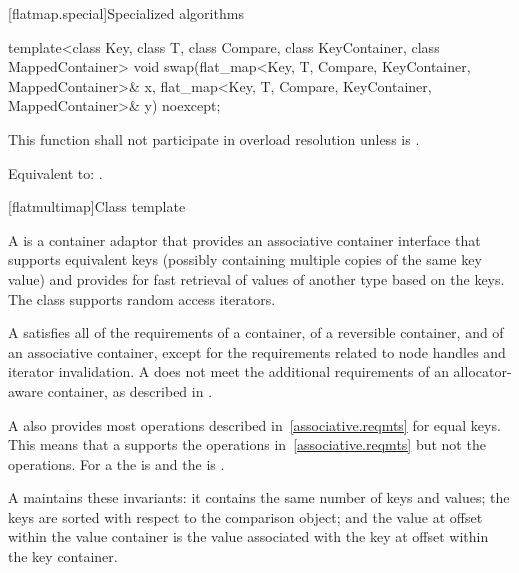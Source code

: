 \begin{codeblock}
\begin{codeblock}
\begin{codeblock}
\begin{addedblock}
[flatmap.special]{Specialized algorithms}

%
\begin{itemdecl}
template<class Key, class T, class Compare, class KeyContainer, class MappedContainer>
  void swap(flat_map<Key, T, Compare, KeyContainer, MappedContainer>& x,
            flat_map<Key, T, Compare, KeyContainer, MappedContainer>& y) noexcept;
\end{itemdecl}

\begin{itemdescr}
\pnum
\remarks
This function shall not participate in overload resolution
unless 
is .

\pnum
\effects Equivalent to: .
\end{itemdescr}

[flatmultimap]{Class template }

\pnum
{}%
\pnum
A  is a container adaptor that provides an associative
container interface that supports equivalent keys (possibly containing
multiple copies of the same key value) and provides for fast retrieval of
values of another type  based on the keys. The 
class supports random access iterators.

\pnum
A  satisfies all of the requirements of a container, of a
reversible container, and of an associative
container, except for the requirements related to
node handles and iterator
invalidation.  A 
does not meet the additional requirements of an allocator-aware container, as
described in
.

\pnum
A  also provides most operations described
in~\ref{associative.reqmts} for equal keys.  This means that a
 supports the  operations
in~\ref{associative.reqmts} but not the  operations.  For
a  the  is  and the
 is .

\pnum
A   maintains these invariants: it contains the
same number of keys and values; the keys are sorted with respect to the
comparison object; and the value at offset  within the value
container is the value associated with the key at offset  within the
key container.


\end{addedblock}
\end{codeblock}
\end{codeblock}
\end{codeblock}
